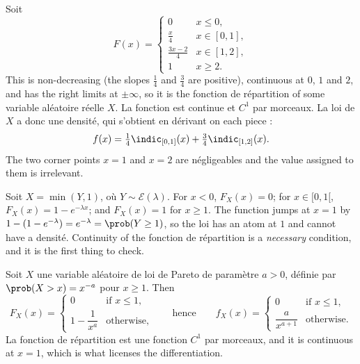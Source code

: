 \begin{example}
  Soit
  \[
    F(x) =
    \begin{cases}
      0 & x \leq 0,\\
      \tfrac{x}{4} & x \in [0,1],\\
      \tfrac{3x-2}{4} & x \in [1,2],\\
      1 & x \geq 2 .
    \end{cases}
  \]
  This is non-decreasing (the slopes $\tfrac14$ and $\tfrac34$ are positive),
  continuous at $0$, $1$ and $2$, and has the right limits at $\pm\infty$, so it
  is the fonction de répartition of some variable aléatoire réelle $X$. La
  fonction est continue et $C^{1}$ par morceaux. La loi de $X$ a donc une densité,
  qui s'obtient en dérivant on each piece :
  \[
    f(x) = \tfrac14 \indic_{[0,1]}(x) + \tfrac34 \indic_{[1,2]}(x) .
  \]
  The two corner points $x=1$ and $x=2$ are négligeables and the value assigned
  to them is irrelevant.
\end{example}

\begin{example}
  Soit $X = \min(Y,1)$, où $Y \sim \mathcal{E}(\lambda)$. For $x < 0$,
  $F_{X}(x) = 0$; for $x \in [0,1[$, $F_{X}(x) = 1-e^{-\lambda x}$; and
  $F_{X}(x)=1$ for $x \geq 1$. The function jumps at $x=1$ by
  $1 - (1-e^{-\lambda}) = e^{-\lambda} = \prob(Y \geq 1)$, so the loi has an atom
  at $1$ and cannot have a densité. Continuity of the fonction de répartition is a
  \emph{necessary} condition, and it is the first thing to check.
\end{example}

\begin{example}
  Soit $X$ une variable aléatoire de loi de Pareto de paramètre $a > 0$, définie
  par $\prob(X > x) = x^{-a}$ pour $x \geq 1$. Then
  \[
    F_{X}(x) =
    \begin{cases}
      0 & \text{if } x \leq 1,\\
      1 - \dfrac{1}{x^{a}} & \text{otherwise},
    \end{cases}
    \qquad\text{hence}\qquad
    f_{X}(x) =
    \begin{cases}
      0 & \text{if } x \leq 1,\\
      \dfrac{a}{x^{a+1}} & \text{otherwise}.
    \end{cases}
  \]
  La fonction de répartition est une fonction $C^{1}$ par morceaux, and it is continuous at $x=1$, which is
  what licenses the differentiation.
\end{example}

